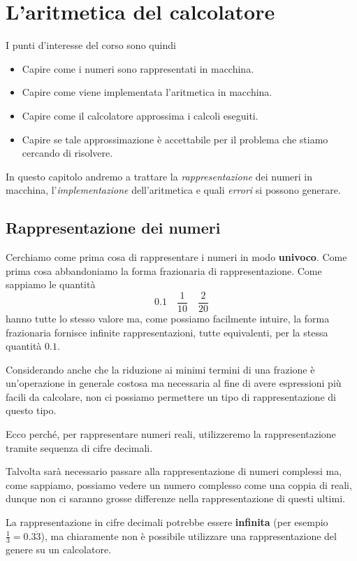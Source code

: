 \chapter{L'aritmetica del calcolatore}
I punti d'interesse del corso sono quindi
\begin{itemize}
	\item Capire come i numeri sono rappresentati in macchina.
	\item Capire come viene implementata l'aritmetica in macchina.
	\item Capire come il calcolatore approssima i calcoli eseguiti.
	\item Capire se tale approssimazione è accettabile per il problema che stiamo cercando di risolvere.
\end{itemize}
In questo capitolo andremo a trattare la \emph{rappresentazione} dei numeri in macchina, l'\emph{implementazione}
dell'aritmetica e quali \emph{errori} si possono generare.

\section{Rappresentazione dei numeri}
Cerchiamo come prima cosa di rappresentare i numeri in modo \textbf{univoco}. Come prima cosa abbandoniamo la
forma frazionaria di rappresentazione. Come sappiamo le quantità
\[ 0.1 \quad \frac{1}{10} \quad \frac{2}{20} \]
hanno tutte lo stesso valore ma, come possiamo facilmente intuire, la forma frazionaria fornisce infinite
rappresentazioni, tutte equivalenti, per la stessa quantità $0.1$.

Considerando anche che la riduzione ai minimi termini di una frazione è un'operazione in generale costosa ma
necessaria al fine di avere espressioni più facili da calcolare, non ci possiamo permettere un tipo di
rappresentazione di questo tipo.

Ecco perché, per rappresentare numeri reali, utilizzeremo la rappresentazione tramite sequenza di cifre decimali.

\begin{observation}
	Talvolta sarà necessario passare alla rappresentazione di numeri complessi ma, come sappiamo, possiamo vedere
	un numero complesso come una coppia di reali, dunque non ci saranno grosse differenze nella rappresentazione
	di questi ultimi.
\end{observation}

\begin{observation}
	La rappresentazione in cifre decimali potrebbe essere \textbf{infinita} (per esempio
	$\frac{1}{3} = 0.\overline{33}$), ma chiaramente non è possibile utilizzare una rappresentazione del genere
	su un calcolatore.
\end{observation}

